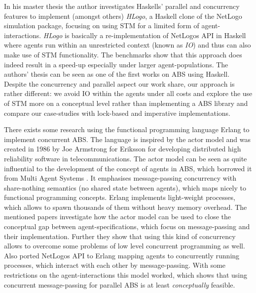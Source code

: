In his master thesis \cite{bezirgiannis_improving_2013} the author investigates Haskells' parallel and concurrency features to implement (amongst others) \textit{HLogo}, a Haskell clone of the NetLogo \cite{wilensky_introduction_2015} simulation package, focusing on using STM for a limited form of agent-interactions. \textit{HLogo} is basically a re-implementation of NetLogos API in Haskell where agents run within an unrestricted context (known as \textit{IO}) and thus can also make use of STM functionality. The benchmarks show that this approach does indeed result in a speed-up especially under larger agent-populations. The authors' thesis can be seen as one of the first works on ABS using Haskell. Despite the concurrency and parallel aspect our work share, our approach is rather different: we avoid IO within the agents under all costs and explore the use of STM more on a conceptual level rather than implementing a ABS library and compare our case-studies with lock-based and imperative implementations.

There exists some research \cite{di_stefano_using_2005, varela_modelling_2004, sher_agent-based_2013} using the functional programming language Erlang \cite{armstrong_erlang_2010} to implement concurrent ABS. The language is inspired by the actor model \cite{agha_actors:_1986} and was created in 1986 by Joe Armstrong for Eriksson for developing distributed high reliability software in telecommunications. The actor model can be seen as quite influential to the development of the concept of agents in ABS, which borrowed it from Multi Agent Systems \cite{wooldridge_introduction_2009}. It emphasises message-passing concurrency with share-nothing semantics (no shared state between agents), which maps nicely to functional programming concepts. Erlang implements light-weight processes, which allows to spawn thousands of them without heavy memory overhead. The mentioned papers investigate how the actor model can be used to close the conceptual gap between agent-specifications, which focus on message-passing and their implementation. Further they show that using this kind of concurrency allows to overcome some problems of low level concurrent programming as well.
Also \cite{bezirgiannis_improving_2013} ported NetLogos API to Erlang mapping agents to concurrently running processes, which interact with each other by message-passing. With some restrictions on the agent-interactions this model worked, which shows that using concurrent message-passing for parallel ABS is at least \textit{conceptually} feasible.

